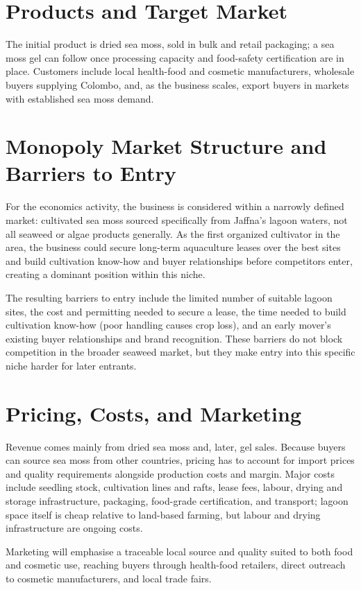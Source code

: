 \section{Products and Target Market}
The initial product is dried sea moss, sold in bulk and retail packaging; a sea moss gel can follow once processing capacity and food-safety certification are in place. Customers include local health-food and cosmetic manufacturers, wholesale buyers supplying Colombo, and, as the business scales, export buyers in markets with established sea moss demand.

\section{Monopoly Market Structure and Barriers to Entry}
For the economics activity, the business is considered within a narrowly defined market: cultivated sea moss sourced specifically from Jaffna's lagoon waters, not all seaweed or algae products generally. As the first organized cultivator in the area, the business could secure long-term aquaculture leases over the best sites and build cultivation know-how and buyer relationships before competitors enter, creating a dominant position within this niche.

The resulting barriers to entry include the limited number of suitable lagoon sites, the cost and permitting needed to secure a lease, the time needed to build cultivation know-how (poor handling causes crop loss), and an early mover's existing buyer relationships and brand recognition. These barriers do not block competition in the broader seaweed market, but they make entry into this specific niche harder for later entrants.

\section{Pricing, Costs, and Marketing}
Revenue comes mainly from dried sea moss and, later, gel sales. Because buyers can source sea moss from other countries, pricing has to account for import prices and quality requirements alongside production costs and margin. Major costs include seedling stock, cultivation lines and rafts, lease fees, labour, drying and storage infrastructure, packaging, food-grade certification, and transport; lagoon space itself is cheap relative to land-based farming, but labour and drying infrastructure are ongoing costs.

Marketing will emphasise a traceable local source and quality suited to both food and cosmetic use, reaching buyers through health-food retailers, direct outreach to cosmetic manufacturers, and local trade fairs.

